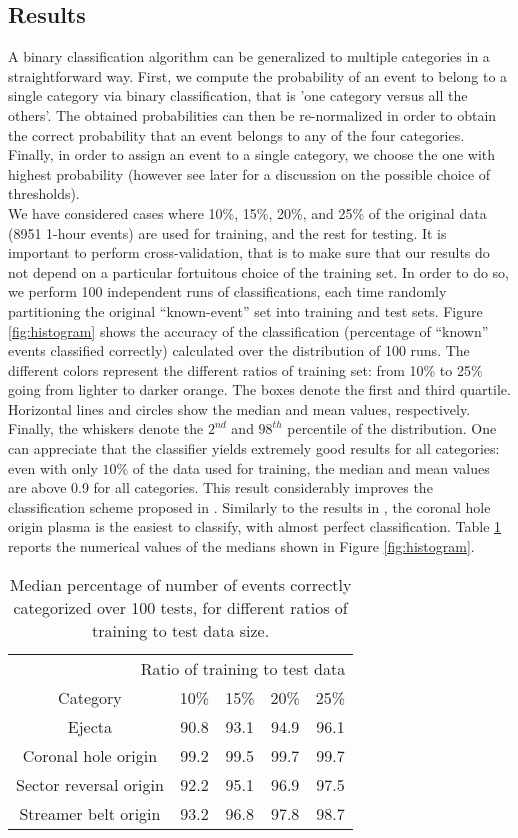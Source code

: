 \documentclass[draft,jgrga]{agutex}
\begin{document}
\begin{article}
\section{Results}
A binary classification algorithm can be generalized to multiple categories in a straightforward way. First, we compute the probability of an event to belong to a single category via binary classification, that is 'one category versus all the others'. 
The obtained probabilities can then be re-normalized in order to obtain the correct probability that an event belongs to any of the four categories. Finally, in order to assign an event to a single category, we choose the one with highest probability (however see later for a discussion on the possible choice of thresholds).\\
We have considered cases where 10\%, 15\%, 20\%, and 25\% of the original data (8951 1-hour events) are used for training, and the rest for testing.
It is important to perform cross-validation, that is to make sure that our results do not depend on a particular fortuitous choice of the training set. {In order to do so, we perform 100 independent runs of classifications, each time randomly partitioning the original ``known-event'' set into training and test sets.}
Figure \ref{fig:histogram} shows the accuracy of the classification (percentage of ``known'' events classified correctly) calculated over the distribution of 100 runs. 
The different colors represent the different ratios of training set: from 10\% to 25\% going from lighter to darker orange. The boxes denote the first and third quartile. Horizontal lines and circles show the median and mean values, respectively. Finally, the whiskers denote the $2^{nd}$ and $98^{th}$ percentile of the distribution. 
One can appreciate that the classifier yields extremely good results for all categories: even with only $10\%$ of the data used for training, the median and mean values are above 0.9 for all categories. This result considerably improves the classification scheme proposed in \cite{xu2015}. Similarly to the results in \cite{xu2015}, the coronal hole origin plasma is the easiest to classify, with almost perfect classification. Table \ref{table:accuracy} reports the numerical values of the medians shown in Figure \ref{fig:histogram}. 

\begin{table}[!ht]
\caption{Median percentage of number of events correctly categorized over 100 tests, for different ratios of training to test data size.}\label{table:accuracy}
\centering
\begin{tabular}{c c c c c}
\hline
\multicolumn{5}{r}{Ratio of training to test data}\\
 Category  & 10\% & 15\% & 20\% & 25\% \\
\hline
  Ejecta  &  90.8 & 93.1 & 94.9 & 96.1\\
  Coronal hole origin  & 99.2 & 99.5 & 99.7 & 99.7\\
  Sector reversal origin   & 92.2 & 95.1 & 96.9 & 97.5 \\
  Streamer belt origin  & 93.2  & 96.8 & 97.8  & 98.7 \\
\hline
\end{tabular}
\end{table}


\end{article}
\end{document}
